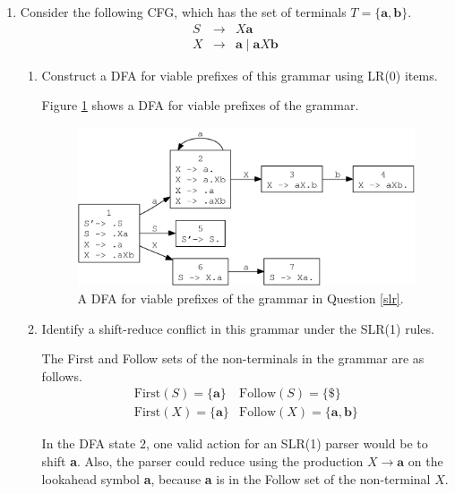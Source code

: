 \documentclass[11pt]{article}
\begin{document}
\begin{enumerate}
\begin{enumerate}
\end{enumerate}

\item
\label{slr}
Consider the following CFG, which has the set of terminals
$T = \{ \textbf{a}, \textbf{b} \}$.
\begin{eqnarray*}
S & \rightarrow & X \textbf{a} \\
X & \rightarrow & \textbf{a} \mid \textbf{a} X \textbf{b}
\end{eqnarray*}

\begin{enumerate}

\item Construct a DFA for viable prefixes of this grammar using LR(0)
items.

Figure \ref{viable-prefix-dfa} shows a DFA for viable prefixes of the
grammar.
\begin{figure}[htb]
\begin{center}
\includegraphics[scale=0.7]{viable-prefix-dfa.pdf}
\caption{A DFA for viable prefixes of the grammar in Question
\ref{slr}.}
\label{viable-prefix-dfa}
\end{center}
\end{figure}

\item Identify a shift-reduce conflict in this grammar under the
SLR(1) rules.

The First and Follow sets of the non-terminals in the grammar are as
follows.
\[
\begin{array}{ll}
\mathrm{First}(S) = \{ \mathbf{a} \}
& \mathrm{Follow}(S) = \{ \textbf{\$} \} \\
\mathrm{First}(X) = \{ \textbf{a} \}
& \mathrm{Follow}(X) = \{ \textbf{a}, \textbf{b} \}
\end{array}
\]

In the DFA state $2$, one valid action for an SLR(1) parser would be
to shift \textbf{a}.  Also, the parser could reduce using the
production $X \rightarrow \textbf{a}$ on the lookahead symbol
\textbf{a}, because \textbf{a} is in the Follow set of the
non-terminal $X$.


\end{enumerate}
\end{enumerate}
\end{document}
